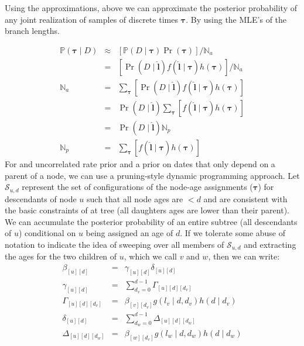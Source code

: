 \documentclass{llncs}
\newcommand{\dataMatrix}[0]{\ensuremath{D}\xspace}
\newcommand{\edgeLen}[1]{\ensuremath{l_{#1}}\xspace}
\newcommand{\edgeLenVec}[0]{\ensuremath{\bm{l}}\xspace}
\newcommand{\timeBinRealizationVec}[0]{\ensuremath{\bm{\tau}}\xspace}
\newcommand{\subtreeAgeSum}[2]{\ensuremath{\beta_{[{#1}][{#2}]}}\xspace}
\newcommand{\leftThreeDTable}[3]{\ensuremath{\Gamma_{[{#1}][{#2}][{#3}]}}\xspace}
\newcommand{\rightThreeDTable}[3]{\ensuremath{\Delta_{[{#1}][{#2}][{#3}]}}\xspace}
\newcommand{\leftSubtreeAgeSum}[2]{\ensuremath{\gamma_{[{#1}][{#2}]}}\xspace}
\newcommand{\rightSubtreeAgeSum}[2]{\ensuremath{\delta_{[{#1}][{#2}]}}\xspace}
\newcommand{\ratePriorDensity}[0]{\ensuremath{g}\xspace}
\newcommand{\timePriorDensity}[0]{\ensuremath{h}\xspace}
\newcommand{\ImpPr}[0]{\ensuremath{\mathbb{P}}\xspace}
\newcommand{\norm}[0]{\ensuremath{\mathbb{N}}\xspace}
\newcommand{\subtreeConst}[2]{\mathcal{S}_{#1,#2}}
\begin{document}
Using the approximations, above we can approximate the posterior probability of any
    joint realization of samples of discrete times $\timeBinRealizationVec$.
By using the MLE's of the branch lengths.

\begin{eqnarray}
    \ImpPr(\timeBinRealizationVec \mid \dataMatrix) & \approx &\left[\ImpPr(D\mid \timeBinRealizationVec)\Pr(\timeBinRealizationVec) \right]/\norm_a\\
    & = & \left[\Pr(D \mid \hat{\edgeLenVec})f(\hat{\edgeLenVec} \mid \timeBinRealizationVec)\timePriorDensity(\timeBinRealizationVec) \right]/\norm_a\\
    \norm_a & = & \sum_{\timeBinRealizationVec} \left[\Pr(D \mid \hat{\edgeLenVec})f(\hat{\edgeLenVec} \mid \timeBinRealizationVec)\timePriorDensity(\timeBinRealizationVec)\right] \\
    & = & \Pr(D \mid \hat{\edgeLenVec})\sum_{\timeBinRealizationVec} \left[f(\hat{\edgeLenVec} \mid \timeBinRealizationVec)\timePriorDensity(\timeBinRealizationVec)\right] \\
        & = & \Pr(D \mid \hat{\edgeLenVec})\norm_p \\
    \norm_p & = & \sum_{\timeBinRealizationVec} \left[f(\hat{\edgeLenVec} \mid \timeBinRealizationVec)\timePriorDensity(\timeBinRealizationVec)\right]
\end{eqnarray}
For and uncorrelated rate prior and a prior on dates that only depend on a parent of a node, we can
    use a pruning-style dynamic programming approach.
Let $\subtreeConst{u}{d}$ represent the set of configurations of the node-age assignments ($\timeBinRealizationVec$)
    for descendants of node $u$ such that all node ages are $<d$ and are consistent
    with the basic constraints of at tree (all daughters ages are lower than their parent).
We can accumulate the posterior probability of an entire subtree (all descendants of $u$)
    conditional on $u$ being assigned an age of $d$.
If we tolerate some abuse of notation to indicate the idea of 
    sweeping over all members of $\subtreeConst{u}{d}$ and extracting the
    ages for the two children of $u$, which we call $v$ and $w$, then
    we can write:
\begin{eqnarray}
\subtreeAgeSum{u}{d} & = & \leftSubtreeAgeSum{u}{d} \rightSubtreeAgeSum{u}{d} \label{brLenSum}\\
\leftSubtreeAgeSum{u}{d} & = & \sum_{d_v = 0}^{d-1} \leftThreeDTable{u}{d}{d_v} \\
\leftThreeDTable{u}{d}{d_v} & = & \subtreeAgeSum{v}{d_v} \ratePriorDensity(\edgeLen{v} \mid d, d_v) \timePriorDensity(d\mid d_v) \\
\rightSubtreeAgeSum{u}{d} & = & \sum_{d_w = 0}^{d-1} \rightThreeDTable{u}{d}{d_w} \\
\rightThreeDTable{u}{d}{d_w} & = & \subtreeAgeSum{w}{d_v} \ratePriorDensity(\edgeLen{w} \mid d, d_w) \timePriorDensity(d\mid d_w) \label{rightSumForBrLenTerm}
\end{eqnarray}
\end{document}
